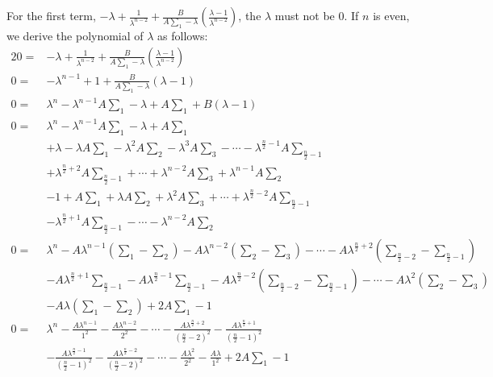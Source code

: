 For the first term, $-\lambda + \frac{1}{\lambda^{n-2}} + \frac{B}{A\sum\limits_{1}-\lambda}\left(\frac{\lambda-1}{\lambda^{n-2}}\right)$, the $\lambda$ must not be $0$. If $n$ is even, we derive the polynomial of $\lambda$ as follows:
\begin{alignat}{2}
0 =& -\lambda + \frac{1}{\lambda^{n-2}} + \frac{B}{A\sum\limits_{1}-\lambda}\left(\frac{\lambda-1}{\lambda^{n-2}}\right)  \nonumber \\
0 =& -\lambda^{n-1} + 1 + \frac{B}{A\sum\limits_{1}-\lambda}\left(\lambda-1\right)  \nonumber \\ 
0 =& \lambda^{n} - \lambda^{n-1}A\sum\limits_{1} - \lambda + A\sum\limits_{1} + B(\lambda - 1)   \nonumber \\ 
0 =& \lambda^{n} - \lambda^{n-1}A\sum\limits_{1} - \lambda + A\sum\limits_{1} & \nonumber \\ 
&+ \lambda -\lambda A\sum\limits_{1} - \lambda^{2}A\sum\limits_{2} - \lambda^{3}A\sum\limits_{3} - \cdots - \lambda^{\frac{n}{2}-1} A\sum\limits_{\frac{n}{2}-1} & \nonumber \\ 
&+ \lambda^{\frac{n}{2}+2} A\sum\limits_{\frac{n}{2}-1} + \cdots  + \lambda^{n-2}A\sum\limits_3 + \lambda^{n-1}A\sum\limits_2   \nonumber \\ 
& - 1 + A\sum\limits_{1} + \lambda A\sum\limits_{2} + \lambda^{2}A\sum\limits_{3} + \cdots + \lambda^{\frac{n}{2}-2} A\sum\limits_{\frac{n}{2}-1} \nonumber \\
& - \lambda^{\frac{n}{2}+1} A\sum\limits_{\frac{n}{2}-1} - \cdots - \lambda^{n-2}A\sum\limits_2 \nonumber \\
0 =& \lambda^{n} - A\lambda^{n-1}\left(\sum\limits_{1} - \sum\limits_{2}\right) - A\lambda^{n-2}\left(\sum\limits_{2} - \sum\limits_{3}\right) - \cdots - A\lambda^{\frac{n}{2}+2}\left(\sum\limits_{\frac{n}{2}-2} - \sum\limits_{\frac{n}{2}-1}\right) \nonumber \\
& - A\lambda^{\frac{n}{2}+1}\sum\limits_{\frac{n}{2}-1} - A\lambda^{\frac{n}{2}-1}\sum\limits_{\frac{n}{2}-1} - A\lambda^{\frac{n}{2}-2}\left(\sum\limits_{\frac{n}{2}-2} - \sum\limits_{\frac{n}{2}-1}\right) - \cdots - A\lambda^{2}\left(\sum\limits_{2} - \sum\limits_{3}\right) \nonumber \\
& - A\lambda\left(\sum\limits_{1} - \sum\limits_{2}\right) + 2A\sum\limits_{1} - 1\nonumber \\
0 =& \lambda^{n} - \frac{A\lambda^{n-1}}{1^2} - \frac{A\lambda^{n-2}}{2^2} - \cdots - \frac{A\lambda^{\frac{n}{2}+2}}{(\frac{n}{2}-2)^2} - \frac{A\lambda^{\frac{n}{2}+1}}{(\frac{n}{2}-1)^2} \nonumber \\
& - \frac{A\lambda^{\frac{n}{2}-1}}{(\frac{n}{2}-1)^2} - \frac{A\lambda^{\frac{n}{2}-2}}{(\frac{n}{2}-2)^2}  - \cdots - \frac{A\lambda^{2}}{2^2}  - \frac{A\lambda}{1^2} + 2A\sum\limits_{1} - 1\nonumber 
\end{alignat}


